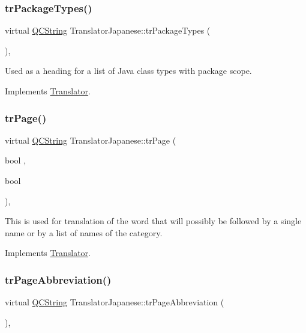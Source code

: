 \subsubsection{\texorpdfstring{trPackageTypes()}{trPackageTypes()}}
{\footnotesize\ttfamily virtual \mbox{\hyperlink{class_q_c_string}{Q\+C\+String}} Translator\+Japanese\+::tr\+Package\+Types (\begin{DoxyParamCaption}{ }\end{DoxyParamCaption})\hspace{0.3cm}{\ttfamily [inline]}, {\ttfamily [virtual]}}

Used as a heading for a list of Java class types with package scope. 

Implements \mbox{\hyperlink{class_translator}{Translator}}.

\mbox{\label{class_translator_japanese_af028c18c284cd40c40a136efc53eab13}} 
\subsubsection{\texorpdfstring{trPage()}{trPage()}}
{\footnotesize\ttfamily virtual \mbox{\hyperlink{class_q_c_string}{Q\+C\+String}} Translator\+Japanese\+::tr\+Page (\begin{DoxyParamCaption}\item[{bool}]{,  }\item[{bool}]{ }\end{DoxyParamCaption})\hspace{0.3cm}{\ttfamily [inline]}, {\ttfamily [virtual]}}

This is used for translation of the word that will possibly be followed by a single name or by a list of names of the category. 

Implements \mbox{\hyperlink{class_translator}{Translator}}.

\mbox{\label{class_translator_japanese_ad4a31890e3764bed24d09c54ab887dcc}} 
\subsubsection{\texorpdfstring{trPageAbbreviation()}{trPageAbbreviation()}}
{\footnotesize\ttfamily virtual \mbox{\hyperlink{class_q_c_string}{Q\+C\+String}} Translator\+Japanese\+::tr\+Page\+Abbreviation (\begin{DoxyParamCaption}{ }\end{DoxyParamCaption})\hspace{0.3cm}{\ttfamily [inline]}, {\ttfamily [virtual]}}

